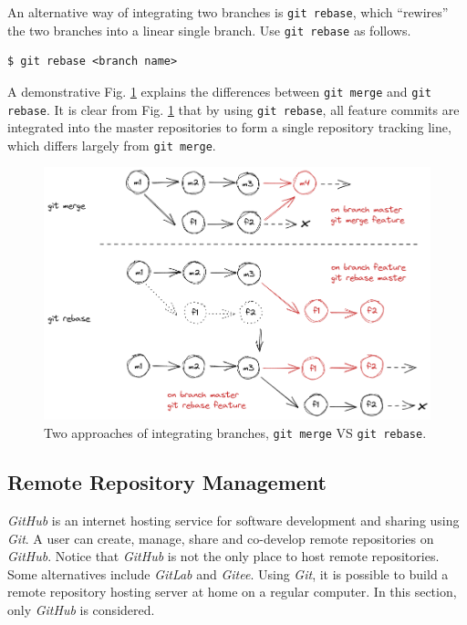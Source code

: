 An alternative way of integrating two branches is \verb|git rebase|, which ``rewires'' the two branches into a linear single branch. Use \verb|git rebase| as follows.
\begin{lstlisting}
$ git rebase <branch name>
\end{lstlisting}
A demonstrative Fig. \ref{ch:sma:fig:gitrebase} explains the differences between \verb|git merge| and \verb|git rebase|. It is clear from Fig. \ref{ch:sma:fig:gitrebase} that by using \verb|git rebase|, all feature commits are integrated into the master repositories to form a single repository tracking line, which differs largely from \verb|git merge|.
\begin{figure}
	\centering
	\includegraphics[width=350pt]{chapters/ch-software-management-advanced/figures/gitrebase.png}
	\caption{Two approaches of integrating branches, \texttt{git merge} VS \texttt{git rebase}.} \label{ch:sma:fig:gitrebase}
\end{figure}

\subsection{Remote Repository Management} \label{ch:sma:sec:rrm}

\textit{GitHub} is an internet hosting service for software development and sharing using \textit{Git}. A user can create, manage, share and co-develop remote repositories on \textit{GitHub}. Notice that \textit{GitHub} is not the only place to host remote repositories. Some alternatives include \textit{GitLab} and \textit{Gitee}. Using \textit{Git}, it is possible to build a remote repository hosting server at home on a regular computer. In this section, only \textit{GitHub} is considered.

